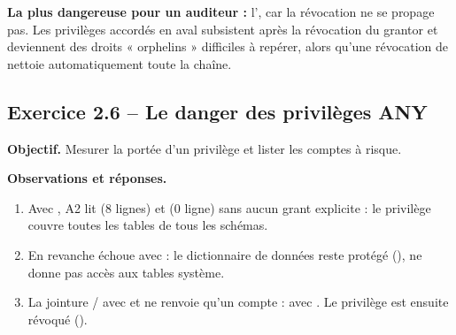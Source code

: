 \textbf{La plus dangereuse pour un auditeur :} l', car la révocation ne se propage pas.
Les privilèges accordés en aval subsistent après la révocation du grantor et deviennent des droits
« orphelins » difficiles à repérer, alors qu'une révocation de  nettoie automatiquement
toute la chaîne.

\subsection{Exercice 2.6 -- Le danger des privilèges ANY}
\textbf{Objectif.} Mesurer la portée d'un privilège  et lister les comptes à risque.


\textbf{Observations et réponses.}
\begin{enumerate}
  \item Avec , A2 lit  (8 lignes) et 
        (0 ligne) sans aucun grant explicite : le privilège couvre toutes les tables de tous les schémas.
  \item En revanche  échoue avec  : le dictionnaire de
        données reste protégé (),  ne donne pas accès
        aux tables système.
  \item La jointure / avec  et
         ne renvoie qu'un compte :  avec .
        Le privilège est ensuite révoqué ().
\end{enumerate}
